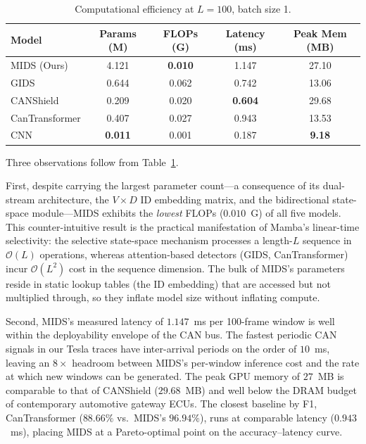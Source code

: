 \documentclass[lettersize,journal]{IEEEtran}
\begin{document}
\begin{table}[t]
\centering
\caption{Computational efficiency at $L=100$, batch size 1.}
\label{tab:efficiency}
\small
\setlength{\tabcolsep}{4pt}
\begin{tabular}{l|cccc}
\hline
\textbf{Model} & \textbf{Params (M)} & \textbf{FLOPs (G)} & \textbf{Latency (ms)} & \textbf{Peak Mem (MB)} \\
\hline
MIDS (Ours)    & 4.121          & \textbf{0.010} & 1.147          & 27.10 \\
GIDS           & 0.644          & 0.062          & 0.742          & 13.06 \\
CANShield      & 0.209          & 0.020          & \textbf{0.604} & 29.68 \\
CanTransformer & 0.407          & 0.027          & 0.943          & 13.53 \\
CNN            & \textbf{0.011} & 0.001          & 0.187          & \textbf{9.18} \\
\hline
\end{tabular}
\end{table}

Three observations follow from Table~\ref{tab:efficiency}. 

First, despite carrying the largest parameter count---a consequence 
of its dual-stream architecture, the $V \times D$ ID embedding 
matrix, and the bidirectional state-space module---MIDS exhibits 
the \emph{lowest} FLOPs ($0.010$~G) of all five models. This 
counter-intuitive result is the practical manifestation of Mamba's 
linear-time selectivity: the selective state-space mechanism 
processes a length-$L$ sequence in $\mathcal{O}(L)$ operations, 
whereas attention-based detectors (GIDS, CanTransformer) incur 
$\mathcal{O}(L^2)$ cost in the sequence dimension. The bulk of 
MIDS's parameters reside in static lookup tables (the ID embedding) 
that are accessed but not multiplied through, so they inflate model 
size without inflating compute.

Second, MIDS's measured latency of $1.147$~ms per 100-frame window
is well within the deployability envelope of the CAN bus. The
fastest periodic CAN signals in our Tesla traces have inter-arrival
periods on the order of $10$~ms, leaving an $8\times$ headroom
between MIDS's per-window inference cost and the rate at which new
windows can be generated. The peak GPU memory of $27$~MB is
comparable to that of CANShield ($29.68$~MB) and well below the
DRAM budget of contemporary automotive gateway ECUs. The closest
baseline by F1, CanTransformer ($88.66\%$ vs.\ MIDS's $96.94\%$),
runs at comparable latency ($0.943$~ms), placing MIDS at a
Pareto-optimal point on the accuracy--latency curve.
\end{document}
